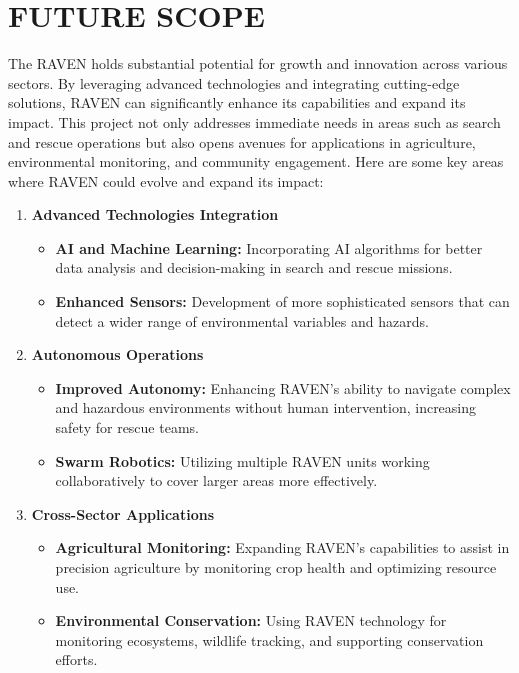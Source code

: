 \newpage

\pagestyle{fancy}
\fancyhf{} 
\fancyhead[L]{{\footnotesize \textbf{\shortprojname}}\hfill{\footnotesize \leftmark}}
\fancyfoot[C]{\thepage}


\chapter{FUTURE SCOPE} \label{chap:FutSco}
{
	
	\fontsize{12}{14}
	
	The RAVEN holds substantial potential for growth and innovation across various sectors. By
	leveraging advanced technologies and integrating cutting-edge solutions, RAVEN can
	significantly enhance its capabilities and expand its impact. This project not only addresses
	immediate needs in areas such as search and rescue operations but also opens avenues for
	applications in agriculture, environmental monitoring, and community engagement. Here are
	some key areas where RAVEN could evolve and expand its impact:
	
	
	\begin{enumerate}[label=\textbf{\arabic*}., leftmargin=*]
		\item \textbf{Advanced Technologies Integration}
		\begin{itemize}
			\item \textbf{AI and Machine Learning:} Incorporating AI algorithms for better data analysis and
			decision-making in search and rescue missions.
			\item \textbf{Enhanced Sensors:} Development of more sophisticated sensors that can detect a wider
			range of environmental variables and hazards.
		\end{itemize}
		
		\item \textbf{Autonomous Operations}
		\begin{itemize}
			\item \textbf{Improved Autonomy:} Enhancing RAVEN's ability to navigate complex and
			hazardous environments without human intervention, increasing safety for rescue
			teams.
			\item \textbf{Swarm Robotics:} Utilizing multiple RAVEN units working collaboratively to cover
			larger areas more effectively.
		\end{itemize}
		
		\item \textbf{Cross-Sector Applications}
		\begin{itemize}
			\item \textbf{Agricultural Monitoring:} Expanding RAVEN’s capabilities to assist in precision
			agriculture by monitoring crop health and optimizing resource use.
			\item \textbf{Environmental Conservation:} Using RAVEN technology for monitoring ecosystems,
			wildlife tracking, and supporting conservation efforts.
		\end{itemize}
		

\end{enumerate}}
